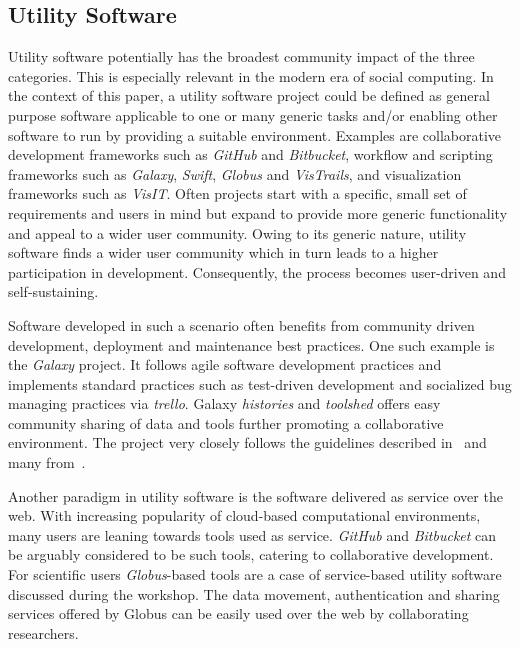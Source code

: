 \documentclass[11pt, oneside]{amsart}
\begin{document}
\subsection{Utility Software}
Utility software potentially has the broadest community impact of the three
categories. This is especially relevant in the modern era of social computing.
In the context of this paper, a utility software project could be defined as
general purpose software applicable to one or many generic tasks and/or
enabling other software to run by providing a suitable environment. Examples
are collaborative development frameworks such as \emph{GitHub} and
\emph{Bitbucket}, workflow and scripting frameworks such as \emph{Galaxy},
\emph{Swift}, \emph{Globus} and \emph{VisTrails}, and visualization frameworks
such as \emph{VisIT}. Often projects start with a specific, small set of
requirements and users in mind but expand to provide more generic functionality
and appeal to a wider user community. Owing to its generic nature, utility
software finds a wider user community which in turn leads to a higher
participation in development. Consequently, the process becomes user-driven and
self-sustaining.

Software developed in such a scenario often benefits from
community driven development, deployment and maintenance best practices. One
such example is the \emph{Galaxy} project. It follows agile software
development practices and implements standard practices such as test-driven
development and socialized bug managing practices via \emph{trello}. Galaxy
\emph{histories} and \emph{toolshed} offers easy community sharing of data and
tools further promoting a collaborative environment. The project very closely
follows the guidelines described in~\cite{Carver_WSSSPE} and many
from~\cite{Prlic_WSSSPE}. 

Another paradigm in utility software is the software delivered as service over
the web. With increasing popularity of cloud-based computational environments,
many users are leaning towards tools used as service. \emph{GitHub} and
\emph{Bitbucket} can be arguably considered to be such tools, catering to
collaborative development. For scientific users \emph{Globus}-based tools are
a case of service-based utility software discussed during the workshop. The
data movement, authentication and sharing services offered by Globus can be
easily used over the web by collaborating researchers.
\end{document}
